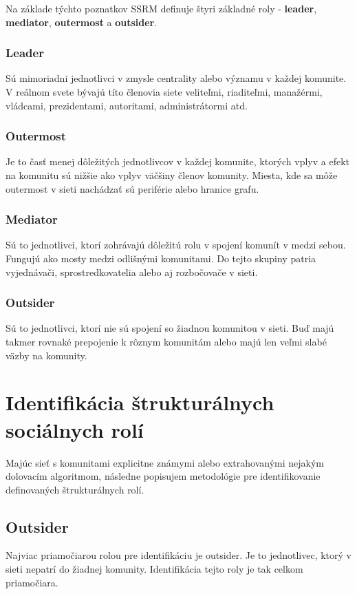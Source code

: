 \documentclass[slovak,master,public,dept460,male,cpdeclaration,oneside]{diploma}
\begin{document}
Na základe týchto poznatkov SSRM definuje štyri základné roly - \textbf{leader}, \textbf{mediator}, \textbf{outermost} a \textbf{outsider}.

\subsubsection{Leader}
Sú mimoriadni jednotlivci v zmysle centrality alebo významu v každej komunite. V reálnom svete bývajú títo členovia siete veliteľmi, riaditeľmi, manažérmi,  vládcami, prezidentami, autoritami, administrátormi atd.

\subsubsection{Outermost}
Je to časť menej dôležitých jednotlivcov v každej komunite, ktorých vplyv a efekt na komunitu sú nižšie ako vplyv väčšiny členov komunity. Miesta, kde sa môže outermost v sieti nachádzať sú periférie alebo hranice grafu.

\subsubsection{Mediator}
Sú to jednotlivci, ktorí zohrávajú dôležitú rolu v spojení komunít v medzi sebou. Fungujú ako mosty medzi odlišnými komunitami. Do tejto skupiny patria vyjednávači, sprostredkovatelia alebo aj rozbočovače v sieti. 

\subsubsection{Outsider}
Sú to jednotlivci, ktorí nie sú spojení so žiadnou komunitou v sieti. Buď majú takmer rovnaké prepojenie k rôznym komunitám alebo majú len veľmi slabé väzby na komunity.



\section{Identifikácia štrukturálnych sociálnych rolí} \label{identifikacia}
Majúc sieť s komunitami explicitne známymi alebo extrahovanými nejakým dolovacím algoritmom, následne popisujem metodológie pre identifikovanie definovaných štrukturálnych rolí.

\subsection{Outsider}
Najviac priamočiarou rolou pre identifikáciu je outsider. Je to jednotlivec, ktorý v sieti nepatrí do žiadnej komunity. Identifikácia tejto roly je tak celkom priamočiara.
\end{document}
